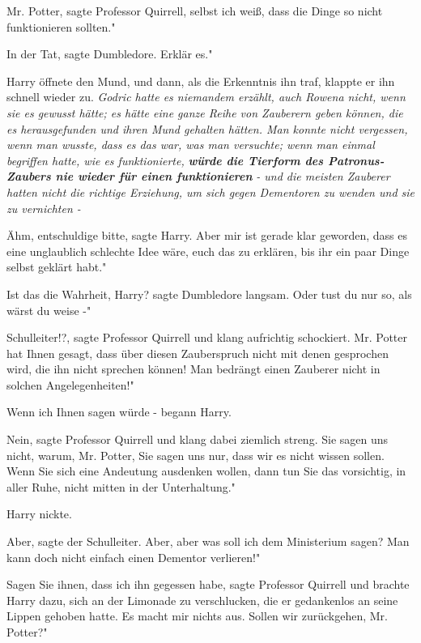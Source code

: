 \glqq Mr. Potter\grqq{}, sagte Professor Quirrell, \glqq selbst ich weiß, dass
die Dinge so nicht funktionieren sollten."

\glqq In der Tat\grqq{}, sagte Dumbledore. \glqq Erklär es."

Harry öffnete den Mund, und dann, als die Erkenntnis ihn traf, klappte er ihn
schnell wieder zu. \emph{ Godric hatte es niemandem erzählt, auch Rowena nicht,
wenn sie es gewusst hätte; es hätte eine ganze Reihe von Zauberern geben können,
die es herausgefunden und ihren Mund gehalten hätten. Man konnte nicht
vergessen, wenn man wusste, dass es das war, was man versuchte; wenn man einmal
begriffen hatte, wie es funktionierte, }\textbf{\emph{würde die Tierform des
Patronus-Zaubers nie wieder für einen funktionieren }}\emph{- und die meisten
Zauberer hatten nicht die richtige Erziehung, um sich gegen Dementoren zu wenden
und sie zu vernichten -}

\glqq Ähm, entschuldige bitte\grqq{}, sagte Harry. \glqq Aber mir ist gerade
klar geworden, dass es eine unglaublich schlechte Idee wäre, euch das zu
erklären, bis ihr ein paar Dinge selbst geklärt habt."

\glqq Ist das die Wahrheit, Harry?\grqq{} sagte Dumbledore langsam. \glqq Oder
tust du nur so, als wärst du weise -"

\glqq Schulleiter!?\grqq{}, sagte Professor Quirrell und klang aufrichtig
schockiert. \glqq Mr. Potter hat Ihnen gesagt, dass über diesen Zauberspruch
nicht mit denen gesprochen wird, die ihn nicht sprechen können! Man bedrängt
einen Zauberer nicht in solchen Angelegenheiten!"

\glqq Wenn ich Ihnen sagen würde -\grqq{} begann Harry.

\glqq Nein\grqq{}, sagte Professor Quirrell und klang dabei ziemlich streng.
\glqq Sie sagen uns nicht, warum, Mr. Potter, Sie sagen uns nur, dass wir es
nicht wissen sollen. Wenn Sie sich eine Andeutung ausdenken wollen, dann tun Sie
das vorsichtig, in aller Ruhe, nicht mitten in der Unterhaltung."

Harry nickte.

\glqq Aber\grqq{}, sagte der Schulleiter. \glqq Aber, aber was soll ich dem
Ministerium sagen? Man kann doch nicht einfach einen Dementor verlieren!"

\glqq Sagen Sie ihnen, dass ich ihn gegessen habe\grqq{}, sagte Professor
Quirrell und brachte Harry dazu, sich an der Limonade zu verschlucken, die er
gedankenlos an seine Lippen gehoben hatte. \glqq Es macht mir nichts aus. Sollen
wir zurückgehen, Mr. Potter?"

